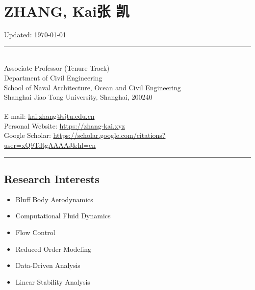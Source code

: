 \documentclass[10pt]{article}
\newenvironment{myitemize}
{ \begin{itemize}
    \setlength{\itemsep}{0pt}
    \setlength{\parskip}{0pt}
    \setlength{\parsep}{0pt}     }
{ \end{itemize}                  }
\begin{document}
\section*{{\huge ZHANG, Kai\quad 张 凯}} 

\vspace{-0.6in}
\null\hfill {\scriptsize Updated:   \today}

\begin{center}
\rule{\textwidth}{0.5pt}
\end{center}
\vspace{-0.34in}
~\\

\noindent Associate Professor (Tenure Track)\\ 
Department of Civil Engineering\\
School of Naval Architecture, Ocean and Civil Engineering\\
Shanghai Jiao Tong University, Shanghai, 200240\\
~\\
E-mail: \href{kai.zhang@sjtu.edu.cn}{kai.zhang@sjtu.edu.cn}\\
Personal Website: \href{https://zhang-kai.xyz}{https://zhang-kai.xyz} \\
Google Scholar: \href{https://scholar.google.com/citations?user=xQ9TdtgAAAAJ&hl=en}{https://scholar.google.com/citations?user=xQ9TdtgAAAAJ\&hl=en}\\

\vspace{-0.34in}
\begin{center}
\rule{\textwidth}{0.5pt}
\end{center}

\subsection*{Research Interests}

\begin{multicols}{2}
\begin{myitemize}
\item Bluff Body Aerodynamics
\item Computational Fluid Dynamics
\item Flow Control
\item Reduced-Order Modeling
\item Data-Driven Analysis
\item Linear Stability Analysis


\end{myitemize}
\end{multicols}
\end{document}
